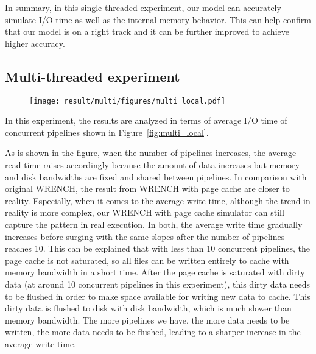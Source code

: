 \documentclass[conference]{IEEEtran}
\begin{document}
			In summary, in this single-threaded experiment, our model can accurately 
			simulate I/O time as well as the internal memory behavior. 
			This can help confirm that our model is on a right track and 
			it can be further improved to achieve higher accuracy.
			
		\subsection{Multi-threaded experiment}
		
			\begin{figure*}		
			\begin{subfigure}{\linewidth}
				\centering
   				\texttt{[image: result/multi/figures/multi\_local.pdf]}
			\end{subfigure}		
			\caption{I/O time of concurrent pipelines with local storage}
			\label{fig:multi_local}
			\end{figure*}		
			
			In this experiment, the results are analyzed in terms of average I/O time 
			of concurrent pipelines shown in Figure~\ref{fig:multi_local}.
			
			As is shown in the figure, when the number of pipelines increases, 
			the average read time raises accordingly because the amount of data 
			increases but memory and disk bandwidths are fixed and shared between pipelines. 
			In comparison with original WRENCH, the result from WRENCH with page cache are closer 
			to reality. 
			Especially, when it comes to the average write time, 
			although the trend in reality is more complex, our WRENCH with page cache 
			simulator can still capture the pattern in real execution.
			In both, the average write time gradually increases before surging with the 
			same slopes after the number of pipelines reaches 10. 
			This can be explained that with less than 10 concurrent pipelines, 
			the page cache is not saturated, so all files can be written entirely to 
			cache with memory bandwidth in a short time. 
			After the page cache is saturated with dirty data (at around 
			10 concurrent pipelines in this experiment), this dirty data needs 
			to be flushed in order to make space available for writing new data to cache. 
			This dirty data is flushed to disk with disk bandwidth, which is much  
			slower than memory bandwidth. 
			The more pipelines we have, the more data needs to be written, the more data 
			needs to be flushed, leading to a sharper increase in the average write time. 
			
\end{document}
